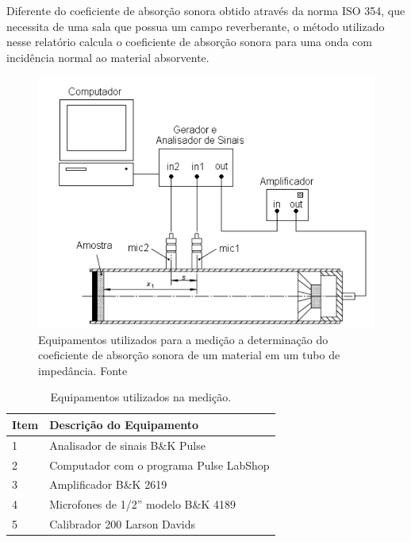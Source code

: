 Diferente do coeficiente de absorção sonora obtido através da norma ISO 354, que necessita de uma sala que possua um campo reverberante, o método utilizado nesse relatório calcula o coeficiente de absorção sonora para uma onda com incidência normal ao material absorvente.


\begin{figure}[h]
\centering
\includegraphics[scale=0.45]{figs/bancada.png}
\caption{Equipamentos utilizados para a medição a determinação do coeficiente de absorção sonora de um material em um tubo de impedância. Fonte \cite{mareze2013analise}}
\label{fig.equipamento}
\end{figure}  

\begin{table}[h]
\centering
\caption{Equipamentos utilizados na medição.}
\label{tab.bancada}
\begin{tabular}{l|l}
Item               & Descrição do Equipamento                                 \\ \hline
1                  & Analisador de sinais B\&K Pulse             \\
2                  & Computador com o programa Pulse LabShop       \\
3                  & Amplificador B\&K 2619\                    \\
4                  & Microfones de 1/2'' modelo B\&K 4189         \\
5                  & Calibrador 200 Larson Davids \\
                                                        
\end{tabular}
\end{table}

